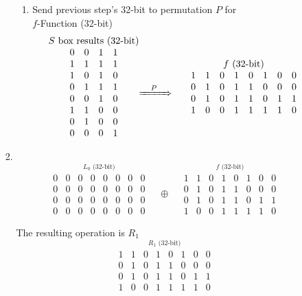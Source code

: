 \documentclass[12pt]{article}
\begin{document}
\begin{enumerate}
\begin{enumerate}
\begin{enumerate}
\begin{enumerate}
				\item
					Send previous step's 32-bit to permutation $P$ for \\
					$f$-Function (32-bit)
					\[
					\stackrel{\mbox{$S$ box results (32-bit)}}{
					\begin{matrix}
						0&0&1&1\\
						1&1&1&1\\
						1&0&1&0\\
						0&1&1&1\\
						0&0&1&0\\
						1&1&0&0\\
						0&1&0&0\\
						0&0&0&1
					\end{matrix}}
					\xRightarrow{\quad P\quad}\quad\quad
					\stackrel{\mbox{$f$ (32-bit)}}{
					\begin{matrix}
						1&1&0&1&0&1&0&0\\
						0&1&0&1&1&0&0&0\\
						0&1&0&1&1&0&1&1\\
						1&0&0&1&1&1&1&0
					\end{matrix}}
					\]
				\end{enumerate}
			\item
				\quad\\
				\[
				\stackrel{\mbox{$L_0$ (32-bit)}}{
					\begin{matrix}
						0&0&0&0&0&0&0&0\\
						0&0&0&0&0&0&0&0\\
						0&0&0&0&0&0&0&0\\
						0&0&0&0&0&0&0&0
					\end{matrix}}
				\quad\oplus\quad
					\stackrel{\mbox{$f$ (32-bit)}}{
					\begin{matrix}
						1&1&0&1&0&1&0&0\\
						0&1&0&1&1&0&0&0\\
						0&1&0&1&1&0&1&1\\
						1&0&0&1&1&1&1&0
					\end{matrix}}
				\]
				
				The resulting operation is $R_1$
				\[
				\stackrel{\mbox{$R_1$ (32-bit)}}{
					\begin{matrix}
						1&1&0&1&0&1&0&0\\
						0&1&0&1&1&0&0&0\\
						0&1&0&1&1&0&1&1\\
						1&0&0&1&1&1&1&0
					\end{matrix}}
				\]
				

\end{enumerate}
\end{enumerate}
\end{enumerate}
\end{document}
